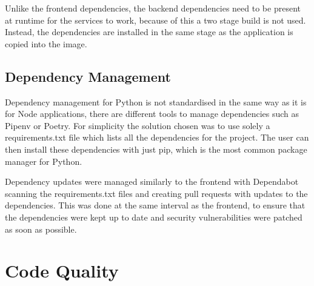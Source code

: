 Unlike the frontend dependencies, the backend dependencies need to be present at runtime for the services to work, because of this a two stage build is not used. Instead, the dependencies are installed in the same stage as the application is copied into the image.

\subsection{Dependency Management}
Dependency management for Python is not standardised in the same way as it is for Node applications, there are different tools to manage dependencies such as Pipenv or Poetry. For simplicity the solution chosen was to use solely a requirements.txt file which lists all the dependencies for the project. The user can then install these dependencies with just pip, which is the most common package manager for Python.

Dependency updates were managed similarly to the frontend with Dependabot scanning the requirements.txt files and creating pull requests with updates to the dependencies. This was done at the same interval as the frontend, to ensure that the dependencies were kept up to date and security vulnerabilities were patched as soon as possible.

\section{Code Quality}~\label{sec:code-quality}
